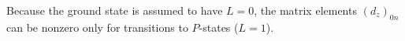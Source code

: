 Because the ground state is assumed to have $L=0$, the matrix elements $(d_z)_{0n}$ can be nonzero only for transitions to $P$-states ($L=1$).
